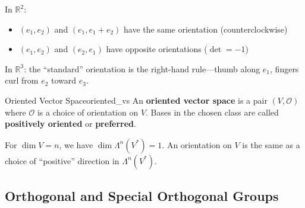\documentclass[11pt, letterpaper, openany]{book}
\begin{document}
\begin{example}
In $\mathbb{R}^2$:
\begin{itemize}
    \item $(e_1, e_2)$ and $(e_1, e_1 + e_2)$ have the same orientation (counterclockwise)
    \item $(e_1, e_2)$ and $(e_2, e_1)$ have opposite orientations ($\det = -1$)
\end{itemize}

\begin{center}
\end{center}

In $\mathbb{R}^3$: the ``standard'' orientation is the right-hand rule---thumb along $e_1$, fingers curl from $e_2$ toward $e_3$.
\end{example}

\begin{defn}{Oriented Vector Space}{oriented_vs}
An \textbf{oriented vector space} is a pair $(V, \mathcal{O})$ where $\mathcal{O}$ is a choice of orientation on $V$. Bases in the chosen class are called \textbf{positively oriented} or \textbf{preferred}.
\end{defn}

\begin{remark}
For $\dim V = n$, we have $\dim \Lambda^n(V^*) = 1$. An orientation on $V$ is the same as a choice of ``positive'' direction in $\Lambda^n(V^*)$.
\end{remark}

\subsection{Orthogonal and Special Orthogonal Groups}
\end{document}
